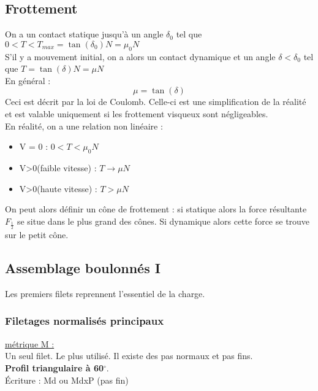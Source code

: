 \documentclass[../main.tex]{subfiles}
\begin{document}
\localtableofcontents
\subsection{Frottement}
On a un contact statique jusqu'à un angle $\delta_0$ tel que $0< T < T_{max} = \tan(\delta_0) N = \mu_0 N$\\
S'il y a mouvement initial, on a alors un contact dynamique et un angle $\delta < \delta_0$ tel que $T=\tan(\delta) N = \mu N$\\

En général : \\
\begin{equation}
    \mu = \tan(\delta)
\end{equation}
Ceci est décrit par la loi de Coulomb. Celle-ci est une simplification de la réalité et est valable uniquement si les frottement visqueux sont négligeables.\\
En réalité, on a une relation non linéaire :\\
\begin{itemize}
    \item V = 0 : $0< T < \mu_0 N$\\
    \item V>0(faible vitesse) : $T\rightarrow \mu N$\\
    \item V>0(haute vitesse) : $T>\mu N$\\
\end{itemize}

On peut alors définir un cône de frottement : si statique alors la force résultante $F_{\frac{1}{2}}$ se situe dans le plus grand des cônes. Si dynamique alors cette force se trouve sur le petit cône.\\

\subsection{Assemblage boulonnés I}
Les premiers filets reprennent l'essentiel de la charge. \\
\subsubsection{Filetages normalisés principaux}
\quad \underline{métrique M :}\\
Un seul filet. Le plus utilisé. Il existe des pas normaux et pas fins. \\
\textbf{Profil triangulaire à 60$^{\circ}$}.\\
Écriture : Md ou MdxP (pas fin)\\
\end{document}
